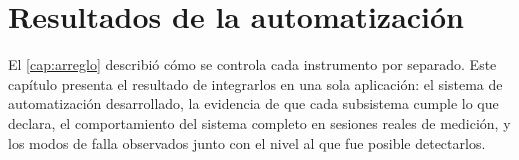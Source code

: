 \chapter{Resultados de la automatización}
\label{cap:resultados}

El \cref{cap:arreglo} describió cómo se controla cada instrumento por
separado. Este capítulo presenta el resultado de integrarlos en una
sola aplicación: el sistema de automatización desarrollado, la
evidencia de que cada subsistema cumple lo que declara, el
comportamiento del sistema completo en sesiones reales de medición, y
los modos de falla observados junto con el nivel al que fue posible
detectarlos.





